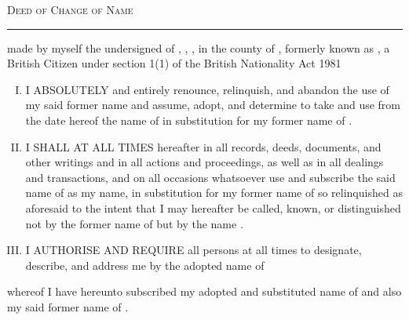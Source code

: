 \documentclass[10pt, twoside, a4paper]{article}
\begin{document}

{
	\centering

	\Huge
	\scshape
	Deed of Change of Name

	\vspace{14pt}

	\hrule

	\par
}

\vspace{48pt}

 made by myself the undersigned \textbf{\newname} of \streetaddress, \city, \postcode, in the county of \county, formerly known as \textbf{\oldname}, a British Citizen under section 1(1) of the British Nationality Act 1981

\vspace{10pt}


\vspace{8pt}

\begin{enumerate}[I.]
    \item I ABSOLUTELY and entirely renounce, relinquish, and abandon the use of my said former name \textbf{\oldname} and assume, adopt, and determine to take and use from the date hereof the name of \textbf{\newname} in substitution for my former name of \textbf{\oldname}.
	
    \item I SHALL AT ALL TIMES hereafter in all records, deeds,	documents, and other writings and in all actions and proceedings, as well as in all dealings and transactions, and on all occasions	whatsoever use and subscribe the said name of \textbf{\newname} as my name, in substitution for my former name of \textbf{\oldname} so relinquished as aforesaid to the intent that I may hereafter be called, known, or distinguished not by the former name of \textbf{\oldname} but by the name \textbf{\newname}.
	
    \item I AUTHORISE AND REQUIRE all persons at all times to
	designate, describe, and address me by the adopted name of
	\textbf{\newname}

\end{enumerate}

\vspace{10pt}

 whereof I have hereunto subscribed my adopted and
substituted name of \textbf{\newname} and also my said former name of
\textbf{\oldname}.
\end{document}

